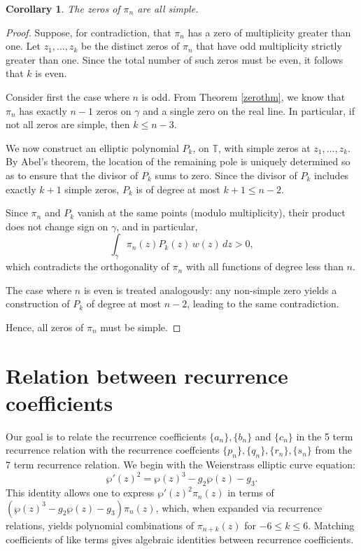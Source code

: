 \documentclass[11pt,a4paper]{article}
\newtheorem{corollary}[theorem]{Corollary}
\theoremstyle{definition}
\numberwithin{equation}{section}
\numberwithin{theorem}{section}
\begin{document}
\begin{corollary}
    The zeros of \( \pi_n \) are all simple.
\end{corollary}
\begin{proof}
    Suppose, for contradiction, that \( \pi_n \) has a zero of multiplicity greater than one. Let \( z_1, \dots, z_k \) be the distinct zeros of \( \pi_n \) that have odd multiplicity strictly greater than one. Since the total number of such zeros must be even, it follows that \( k \) is even.

    Consider first the case where \( n \) is odd. From Theorem \ref{zerothm}, we know that \( \pi_n \) has exactly \( n-1 \)  zeros on \( \gamma \) and a single zero on the real line. In particular, if not all zeros are simple, then \( k \leq n - 3 \). 

    We now construct an elliptic polynomial  \( P_k \), on \( \mathbb{T} \), with simple zeros at \( z_1, \dots, z_k \). By Abel’s theorem, the location of the remaining pole is uniquely determined so as to ensure that the divisor of \( P_k \) sums to zero. Since the divisor of \( P_k \) includes exactly \( k + 1 \) simple zeros, \( P_k \) is of degree at most \( k + 1 \leq n - 2 \).

    Since \( \pi_n \) and \( P_k \) vanish at the same points (modulo multiplicity), their product does not change sign on \( \gamma \), and in particular,
    \[
        \int_\gamma \pi_n(z) P_k(z) \, w(z)\, dz > 0,
    \]
    which contradicts the orthogonality of \( \pi_n \) with all functions of degree less than \( n \).

    The case where \( n \) is even is treated analogously: any non-simple zero yields a construction of \( P_k \) of degree at most \( n - 2 \), leading to the same contradiction.

    Hence, all zeros of \( \pi_n \) must be simple.
\end{proof}
\section{Relation between recurrence coefficients}\label{App:rel_rec_coeff}

Our goal is to relate the recurrence coefficients $\{a_n\},\{b_n\}$ and $\{c_n\}$ in the 5 term recurrence relation with the recurrence coeffcients $\{p_n\},\{q_n\},\{r_n\},\{s_n\}$ from the 7 term recurrence relation. We begin with the Weierstrass elliptic curve equation:
\begin{equation} \label{eq:elliptic_curve}
\wp'(z)^2 = \wp(z)^3 - g_2 \wp(z) - g_3.
\end{equation}
This identity allows one to express \( \wp'(z)^2 \pi_n(z) \) in terms of \( (\wp(z)^3 - g_2 \wp(z) - g_3)\pi_n(z) \), which, when expanded via recurrence relations, yields polynomial combinations of \( \pi_{n+k}(z) \) for \( -6 \le k \le 6 \). Matching coefficients of like terms gives algebraic identities between recurrence coefficients.
\end{document}
